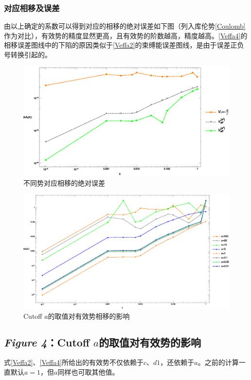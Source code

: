 \documentclass[hyperref,cs4size,titlepage,twoside]{ctexart}
\begin{document}
\subsubsection{对应相移及误差}
由以上确定的系数可以得到对应的相移的绝对误差如下图（列入库伦势\eqref{Coulomb}作为对比），有效势的精度显然更高，且有效势的阶数越高，精度越高。\eqref{Veffa4}的相移误差图线中的下陷的原因类似于\eqref{Veffa2}的束缚能误差图线，是由于误差正负号转换引起的。
\begin{figure}[!htbp]
  \centering
  \includegraphics[width=6in]{Test_PS_CurveFitting_Figure3.eps}
  \caption{不同势对应相移的绝对误差}
\end{figure}
\begin{figure}[!htbp]
  \centering
  \includegraphics[width=6in]{Test_PhaseShift_Various_a.eps}
  \caption{Cutoff $a$的取值对有效势相移的影响}\label{cutoffa}
\end{figure}
\subsection{\emph{Figure 4}：Cutoff $a$的取值对有效势的影响}
式\eqref{Veffa2}、\eqref{Veffa4}所给出的有效势不仅依赖于$c$、$d1$，还依赖于$a$。之前的计算一直默认$a=1$，但$a$同样也可取其他值。
\end{document}
